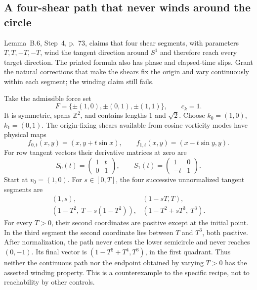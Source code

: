 \documentclass[10pt]{article}
\begin{document}
\subsection*{A four-shear path that never winds around the circle}
Lemma B.6, Step 4, p. 73, claims that four shear segments, with parameters \(T,T,-T,-T\), wind the tangent direction around \(S^1\) and therefore reach every target direction. The printed formula also has phase and elapsed-time slips. Grant the natural corrections that make the shears fix the origin and vary continuously within each segment; the winding claim still fails.\par
Take the admissible force set \[F=\{\pm(1,0),\pm(0,1),\pm(1,1)\},\qquad c_k=1.\] It is symmetric, spans \(\mathbb Z^2\), and contains lengths \(1\) and \(\sqrt2\). Choose \(k_0=(1,0)\), \(k_1=(0,1)\). The origin-fixing shears available from cosine vorticity modes have physical maps \[f_{0,t}(x,y)=(x,y+t\sin x),\qquad
 f_{1,t}(x,y)=(x-t\sin y,y).\] For row tangent vectors their derivative matrices at zero are \[S_0(t)=\begin{pmatrix}1&t\\0&1\end{pmatrix},\qquad
 S_1(t)=\begin{pmatrix}1&0\\-t&1\end{pmatrix}.\] Start at \(v_0=(1,0)\). For \(s\in[0,T]\), the four successive unnormalized tangent segments are \[\begin{array}{ll}
 (1,s),&
 (1-sT,T),\\[2pt]
 (1-T^2,\ T-s(1-T^2)),&
 (1-T^2+sT^3,\ T^3).
\end{array}
 \tag{9}\] For every \(T>0\), their second coordinates are positive except at the initial point. In the third segment the second coordinate lies between \(T\) and \(T^3\), both positive. After normalization, the path never enters the lower semicircle and never reaches \((0,-1)\). Its final vector is \((1-T^2+T^4,T^3)\), in the first quadrant. Thus neither the continuous path nor the endpoint obtained by varying \(T>0\) has the asserted winding property. This is a counterexample to the specific recipe, not to reachability by other controls.\par
\end{document}
